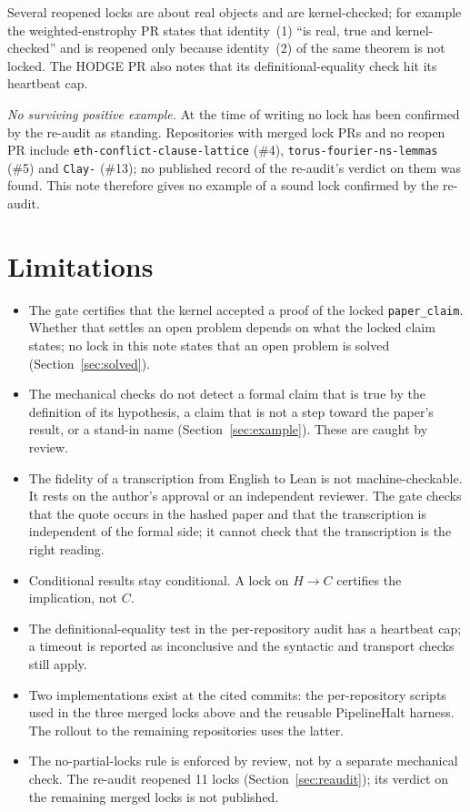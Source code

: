 \documentclass[11pt,a4paper]{article}
\newcommand{\code}[1]{\texttt{#1}}
\begin{document}
Several reopened locks are about real objects and are kernel-checked; for example the
weighted-enstrophy PR states that identity~(1) ``is real, true and kernel-checked'' and is reopened
only because identity~(2) of the same theorem is not locked. The HODGE PR also notes that its
definitional-equality check hit its heartbeat cap.

\emph{No surviving positive example.} At the time of writing no lock has been confirmed by the
re-audit as standing. Repositories with merged lock PRs and no reopen PR include
\code{eth-conflict-clause-lattice} (\#4), \code{torus-fourier-ns-lemmas} (\#5) and \code{Clay-}
(\#13); no published record of the re-audit's verdict on them was found. This note therefore
gives no example of a sound lock confirmed by the re-audit.

\section{Limitations}
\begin{itemize}
\item The gate certifies that the kernel accepted a proof of the locked \code{paper\_claim}.
  Whether that settles an open problem depends on what the locked claim states; no lock in this
  note states that an open problem is solved (Section~\ref{sec:solved}).
\item The mechanical checks do not detect a formal claim that is true by the definition of its
  hypothesis, a claim that is not a step toward the paper's result, or a stand-in name
  (Section~\ref{sec:example}). These are caught by review.
\item The fidelity of a transcription from English to Lean is not machine-checkable. It rests
  on the author's approval or an independent reviewer. The gate checks that the quote occurs in
  the hashed paper and that the transcription is independent of the formal side; it cannot
  check that the transcription is the right reading.
\item Conditional results stay conditional. A lock on $H\to C$ certifies the implication, not $C$.
\item The definitional-equality test in the per-repository audit has a heartbeat cap; a timeout
  is reported as inconclusive and the syntactic and transport checks still apply.
\item Two implementations exist at the cited commits: the per-repository scripts used in the
  three merged locks above and the reusable PipelineHalt harness. The rollout to the remaining
  repositories uses the latter.
\item The no-partial-locks rule is enforced by review, not by a separate mechanical check. The
  re-audit reopened 11 locks (Section~\ref{sec:reaudit}); its verdict on the remaining merged
  locks is not published.
\end{itemize}
\end{document}
